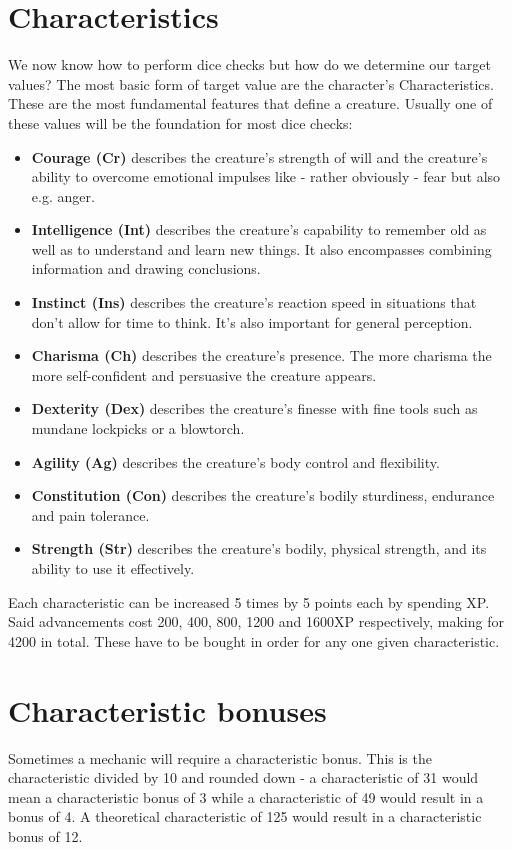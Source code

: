 \documentclass[12pt,a4paper,openany,usenames,dvipsnames]{book}
\begin{document}
	\section{Characteristics}
	We now know how to perform dice checks but how do we determine our target values?
	The most basic form of target value are the character’s Characteristics.
	These are the most fundamental features that define a creature.
	Usually one of these values will be the foundation for most dice checks:
	\begin{itemize}
		\setlength\itemsep{-8mm}
		\item \textbf{Courage (Cr)} describes the creature’s strength of will
			and the creature’s ability to overcome emotional impulses like
			- rather obviously - fear but also e.g. anger.
		\item \textbf{Intelligence (Int)} describes the creature’s capability to remember old as well as to understand and learn new things.
			It also encompasses combining information and drawing conclusions.
		\item \textbf{Instinct (Ins)} describes the creature’s reaction speed in situations that don’t allow for time to think.
			It's also important for general perception.
		\item \textbf{Charisma (Ch)} describes the creature’s presence. The more charisma the more self-confident and persuasive the creature appears.
		\item \textbf{Dexterity (Dex)} describes the creature’s finesse with fine tools such as mundane lockpicks or a blowtorch.
		\item \textbf{Agility (Ag)} describes the creature’s body control and flexibility.
		\item \textbf{Constitution (Con)} describes the creature’s bodily sturdiness, endurance and pain tolerance.
		\item \textbf{Strength (Str)} describes the creature’s bodily, physical strength,
			and its ability to use it effectively.
	\end{itemize}
	Each characteristic can be increased 5 times by 5 points each by spending XP. Said advancements cost 200, 400, 800, 1200 and 1600XP respectively, making for 4200 in total. These have to be bought in order for any one given characteristic.

	\begin{minipage}{\columnwidth}
	\section{Characteristic bonuses}
	Sometimes a mechanic will require a characteristic bonus. This is the characteristic divided by 10 and rounded down - a characteristic of 31 would mean a characteristic bonus of 3 while a characteristic of 49 would result in a bonus of 4. A theoretical characteristic of 125 would result in a characteristic bonus of 12.
	\end{minipage}
\end{document}
